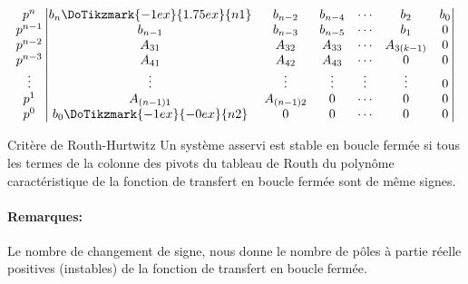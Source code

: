 \[
\begin{matrix}
    p^n    \\
    p^{n-1}\\
    p^{n-2}\\
    p^{n-3}\\
    \vdots \\
    p^1    \\
    p^0    \\
\end{matrix}
\begin{vmatrix}
    b_n\DoTikzmark{-1ex}{1.75ex}{n1} & b_{n-2} & b_{n-4}& \cdots & b_2  & b_0\\
    b_{n-1}              & b_{n-3}   & b_{n-5} & \cdots & b_1      & 0 \\
    A_{31}               & A_{32}    & A_{33}  & \cdots & A_{3(k-1)} & 0 \\
    A_{41}               & A_{42}    & A_{43}  & \cdots & 0        & 0 \\
    \vdots               & \vdots    & \vdots  & \vdots & \vdots   & 0 \\
    A_{(n-1)1}           & A_{(n-1)2}& 0       & \cdots & 0        & 0 \\
    b_0\DoTikzmark{-1ex}{-0ex}{n2}    & 0       & 0      & \cdots & 0 & 0
\end{vmatrix}
\]
\begin{criteria}{Critère de Routh-Hurtwitz}
    Un système asservi est stable en boucle fermée
    si tous les termes de la colonne des pivots 
    du tableau de Routh du polynôme caractéristique 
    de la fonction de transfert en boucle fermée sont de même signes.
\end{criteria}
\paragraph{Remarques:}
Le nombre de changement de signe, nous donne le nombre de pôles à partie 
réelle positives (instables) de la fonction de transfert en boucle fermée.

